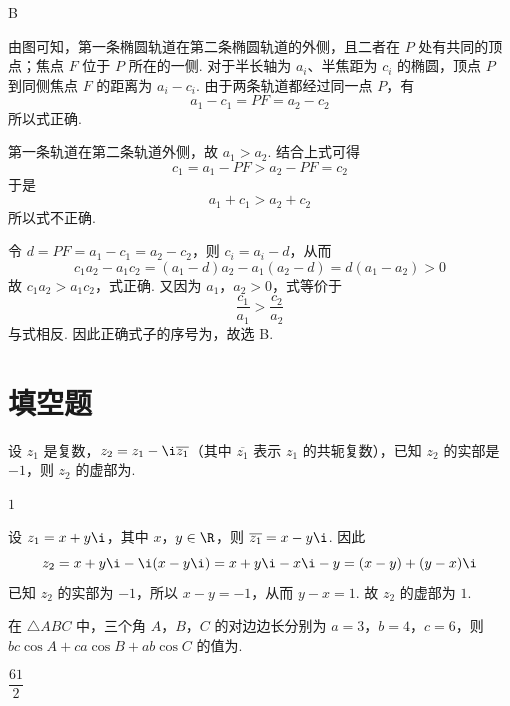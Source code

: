\begin{answer}
B
\end{answer}

\begin{solution}
由图可知，第一条椭圆轨道在第二条椭圆轨道的外侧，且二者在 \(P\) 处有共同的顶点；焦点 \(F\) 位于 \(P\) 所在的一侧. 对于半长轴为 \(a_i\)、半焦距为 \(c_i\) 的椭圆，顶点 \(P\) 到同侧焦点 \(F\) 的距离为 \(a_i-c_i\). 由于两条轨道都经过同一点 \(P\)，有
\[
a_1-c_1=PF=a_2-c_2
\]
所以式正确.

第一条轨道在第二条轨道外侧，故 \(a_1>a_2\). 结合上式可得
\[
c_1=a_1-PF>a_2-PF=c_2
\]
于是
\[
a_1+c_1>a_2+c_2
\]
所以式不正确.

令 \(d=PF=a_1-c_1=a_2-c_2\)，则 \(c_i=a_i-d\)，从而
\[
c_1a_2-a_1c_2=(a_1-d)a_2-a_1(a_2-d)=d(a_1-a_2)>0
\]
故 \(c_1a_2>a_1c_2\)，式正确. 又因为 \(a_1\)，\(a_2>0\)，式等价于
\[
\frac{c_1}{a_1}>\frac{c_2}{a_2}
\]
与式相反. 因此正确式子的序号为，故选 B.
\end{solution}

\section{填空题}

\begin{problem}
设 \(z_{1}\) 是复数，\(z_{2} = z_{1} - \i\overline{z_1}\)（其中 \(\overline{z_1}\) 表示 \(z_{1}\) 的共轭复数），已知 \(z_{2}\) 的实部是 \(-1\)，则 \(z_{2}\) 的虚部为\fillinblank{}.
\end{problem}

\begin{answer}
\(1\)
\end{answer}

\begin{solution}
设 \(z_1=x+y\i\)，其中 \(x\)，\(y\in\R\)，则 \(\overline{z_1}=x-y\i\). 因此
\[
z_2=x+y\i-\i(x-y\i)=x+y\i-x\i-y=(x-y)+(y-x)\i
\]
已知 \(z_2\) 的实部为 \(-1\)，所以 \(x-y=-1\)，从而 \(y-x=1\). 故 \(z_2\) 的虚部为 \(1\).
\end{solution}

\begin{problem}
在 \(\triangle ABC\) 中，三个角 \(A\)，\(B\)，\(C\) 的对边边长分别为 \(a = 3\)，\(b = 4\)，\(c = 6\)，则 \(bc \cos A + ca \cos B + ab \cos C\) 的值为\fillinblank{}.
\end{problem}

\begin{answer}
\(\dfrac{61}{2}\)
\end{answer}

